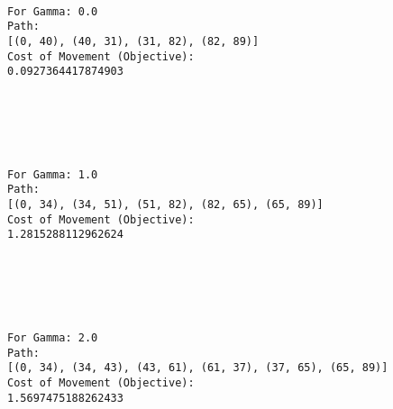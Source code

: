 \documentclass[11pt]{article}
\begin{document}
    \begin{Verbatim}[commandchars=\\\{\}]

For Gamma: 0.0
Path:
[(0, 40), (40, 31), (31, 82), (82, 89)]
Cost of Movement (Objective):
0.0927364417874903

    \end{Verbatim}

    \begin{center}
    \end{center}
    { \hspace*{\fill} \\}
    
    \begin{center}
    \end{center}
    { \hspace*{\fill} \\}
    
    \begin{Verbatim}[commandchars=\\\{\}]

For Gamma: 1.0
Path:
[(0, 34), (34, 51), (51, 82), (82, 65), (65, 89)]
Cost of Movement (Objective):
1.2815288112962624

    \end{Verbatim}

    \begin{center}
    \end{center}
    { \hspace*{\fill} \\}
    
    \begin{center}
    \end{center}
    { \hspace*{\fill} \\}
    
    \begin{Verbatim}[commandchars=\\\{\}]

For Gamma: 2.0
Path:
[(0, 34), (34, 43), (43, 61), (61, 37), (37, 65), (65, 89)]
Cost of Movement (Objective):
1.5697475188262433

    \end{Verbatim}
\end{document}
